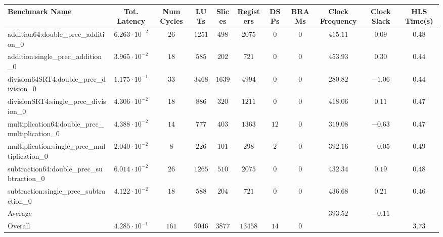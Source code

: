 \begin{tabular}{|l|c|c|c|c|c|c|c|c|c|c|}
\hline
Benchmark Name                                   & Tot. Latency            & Num Cycles & LUTs     & Slices   & Registers & DSPs   & BRAMs & Clock Frequency & Clock Slack & HLS Time(s) \\
\hline
addition64:double\_prec\_addition\_0             & $ 6.263 \cdot 10^{-2} $ & $ 26     $ & $ 1251 $ & $ 498  $ & $ 2075  $ & $ 0  $ & $ 0 $ & $ 415.11      $ & $ 0.09    $ & $ 0.48    $ \\
addition:single\_prec\_addition\_0               & $ 3.965 \cdot 10^{-2} $ & $ 18     $ & $ 585  $ & $ 202  $ & $ 721   $ & $ 0  $ & $ 0 $ & $ 453.93      $ & $ 0.30    $ & $ 0.44    $ \\
division64SRT4:double\_prec\_division\_0         & $ 1.175 \cdot 10^{-1} $ & $ 33     $ & $ 3468 $ & $ 1639 $ & $ 4994  $ & $ 0  $ & $ 0 $ & $ 280.82      $ & $ -1.06   $ & $ 0.44    $ \\
divisionSRT4:single\_prec\_division\_0           & $ 4.306 \cdot 10^{-2} $ & $ 18     $ & $ 886  $ & $ 320  $ & $ 1211  $ & $ 0  $ & $ 0 $ & $ 418.06      $ & $ 0.11    $ & $ 0.47    $ \\
multiplication64:double\_prec\_multiplication\_0 & $ 4.388 \cdot 10^{-2} $ & $ 14     $ & $ 777  $ & $ 403  $ & $ 1363  $ & $ 12 $ & $ 0 $ & $ 319.08      $ & $ -0.63   $ & $ 0.47    $ \\
multiplication:single\_prec\_multiplication\_0   & $ 2.040 \cdot 10^{-2} $ & $ 8      $ & $ 226  $ & $ 101  $ & $ 298   $ & $ 2  $ & $ 0 $ & $ 392.16      $ & $ -0.05   $ & $ 0.49    $ \\
subtraction64:double\_prec\_subtraction\_0       & $ 6.014 \cdot 10^{-2} $ & $ 26     $ & $ 1265 $ & $ 510  $ & $ 2075  $ & $ 0  $ & $ 0 $ & $ 432.34      $ & $ 0.19    $ & $ 0.48    $ \\
subtraction:single\_prec\_subtraction\_0         & $ 4.122 \cdot 10^{-2} $ & $ 18     $ & $ 588  $ & $ 204  $ & $ 721   $ & $ 0  $ & $ 0 $ & $ 436.68      $ & $ 0.21    $ & $ 0.46    $ \\
\hline
Average                                          & $                     $ & $        $ & $      $ & $      $ & $       $ & $    $ & $   $ & $ 393.52      $ & $ -0.11   $ & $         $ \\
\hline
Overall                                          & $ 4.285 \cdot 10^{-1} $ & $ 161    $ & $ 9046 $ & $ 3877 $ & $ 13458 $ & $ 14 $ & $ 0 $ & $             $ & $         $ & $ 3.73    $ \\
\hline
\end{tabular}
